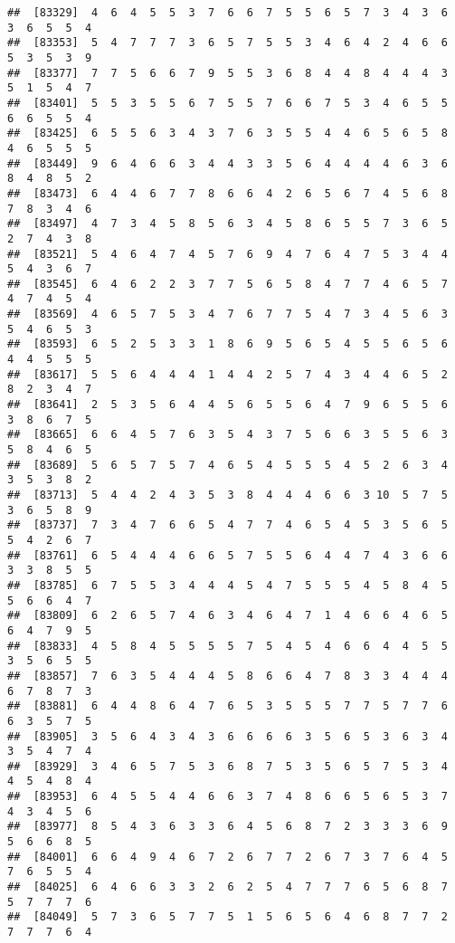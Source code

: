 \documentclass[
]{book}
\begin{document}
\begin{verbatim}
##  [83329]  4  6  4  5  5  3  7  6  6  7  5  5  6  5  7  3  4  3  6  3  6  5  5  4
##  [83353]  5  4  7  7  7  3  6  5  7  5  5  3  4  6  4  2  4  6  6  5  3  5  3  9
##  [83377]  7  7  5  6  6  7  9  5  5  3  6  8  4  4  8  4  4  4  3  5  1  5  4  7
##  [83401]  5  5  3  5  5  6  7  5  5  7  6  6  7  5  3  4  6  5  5  6  6  5  5  4
##  [83425]  6  5  5  6  3  4  3  7  6  3  5  5  4  4  6  5  6  5  8  4  6  5  5  5
##  [83449]  9  6  4  6  6  3  4  4  3  3  5  6  4  4  4  4  6  3  6  8  4  8  5  2
##  [83473]  6  4  4  6  7  7  8  6  6  4  2  6  5  6  7  4  5  6  8  7  8  3  4  6
##  [83497]  4  7  3  4  5  8  5  6  3  4  5  8  6  5  5  7  3  6  5  2  7  4  3  8
##  [83521]  5  4  6  4  7  4  5  7  6  9  4  7  6  4  7  5  3  4  4  5  4  3  6  7
##  [83545]  6  4  6  2  2  3  7  7  5  6  5  8  4  7  7  4  6  5  7  4  7  4  5  4
##  [83569]  4  6  5  7  5  3  4  7  6  7  7  5  4  7  3  4  5  6  3  5  4  6  5  3
##  [83593]  6  5  2  5  3  3  1  8  6  9  5  6  5  4  5  5  6  5  6  4  4  5  5  5
##  [83617]  5  5  6  4  4  4  1  4  4  2  5  7  4  3  4  4  6  5  2  8  2  3  4  7
##  [83641]  2  5  3  5  6  4  4  5  6  5  5  6  4  7  9  6  5  5  6  3  8  6  7  5
##  [83665]  6  6  4  5  7  6  3  5  4  3  7  5  6  6  3  5  5  6  3  5  8  4  6  5
##  [83689]  5  6  5  7  5  7  4  6  5  4  5  5  5  4  5  2  6  3  4  3  5  3  8  2
##  [83713]  5  4  4  2  4  3  5  3  8  4  4  4  6  6  3 10  5  7  5  3  6  5  8  9
##  [83737]  7  3  4  7  6  6  5  4  7  7  4  6  5  4  5  3  5  6  5  5  4  2  6  7
##  [83761]  6  5  4  4  4  6  6  5  7  5  5  6  4  4  7  4  3  6  6  3  3  8  5  5
##  [83785]  6  7  5  5  3  4  4  4  5  4  7  5  5  5  4  5  8  4  5  5  6  6  4  7
##  [83809]  6  2  6  5  7  4  6  3  4  6  4  7  1  4  6  6  4  6  5  6  4  7  9  5
##  [83833]  4  5  8  4  5  5  5  5  7  5  4  5  4  6  6  4  4  5  5  3  5  6  5  5
##  [83857]  7  6  3  5  4  4  4  5  8  6  6  4  7  8  3  3  4  4  4  6  7  8  7  3
##  [83881]  6  4  4  8  6  4  7  6  5  3  5  5  5  7  7  5  7  7  6  6  3  5  7  5
##  [83905]  3  5  6  4  3  4  3  6  6  6  6  3  5  6  5  3  6  3  4  3  5  4  7  4
##  [83929]  3  4  6  5  7  5  3  6  8  7  5  3  5  6  5  7  5  3  4  4  5  4  8  4
##  [83953]  6  4  5  5  4  4  6  6  3  7  4  8  6  6  5  6  5  3  7  4  3  4  5  6
##  [83977]  8  5  4  3  6  3  3  6  4  5  6  8  7  2  3  3  3  6  9  5  6  6  8  5
##  [84001]  6  6  4  9  4  6  7  2  6  7  7  2  6  7  3  7  6  4  5  7  6  5  5  4
##  [84025]  6  4  6  6  3  3  2  6  2  5  4  7  7  7  6  5  6  8  7  5  7  7  7  6
##  [84049]  5  7  3  6  5  7  7  5  1  5  6  5  6  4  6  8  7  7  2  7  7  7  6  4

\end{verbatim}
\end{document}
